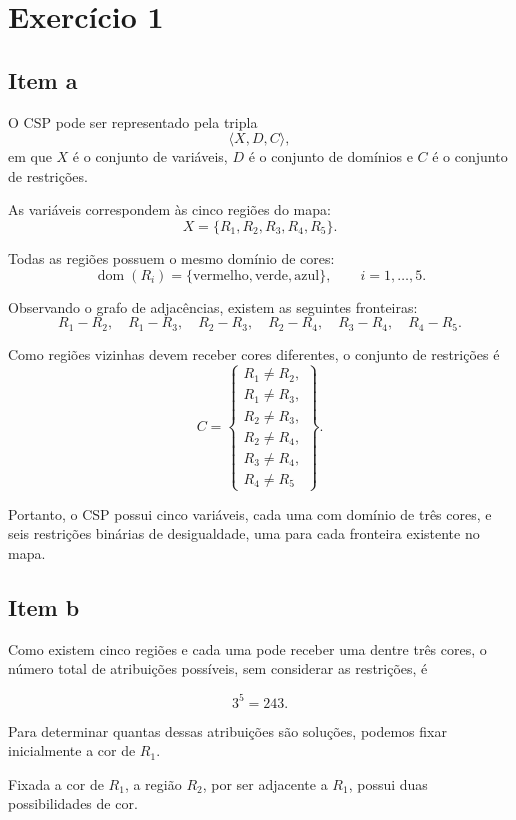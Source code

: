 \section{Exercício 1}
\subsection{Item a}

O CSP pode ser representado pela tripla
\[
\langle X,D,C\rangle,
\]
em que $X$ é o conjunto de variáveis, $D$ é o conjunto de domínios
e $C$ é o conjunto de restrições.

As variáveis correspondem às cinco regiões do mapa:
\[
X=\{R_1,R_2,R_3,R_4,R_5\}.
\]

Todas as regiões possuem o mesmo domínio de cores:
\[
\operatorname{dom}(R_i)
=
\{\text{vermelho},\text{verde},\text{azul}\},
\qquad i=1,\ldots,5.
\]

Observando o grafo de adjacências, existem as seguintes fronteiras:
\[
R_1-R_2,\quad
R_1-R_3,\quad
R_2-R_3,\quad
R_2-R_4,\quad
R_3-R_4,\quad
R_4-R_5.
\]

Como regiões vizinhas devem receber cores diferentes, o conjunto de
restrições é
\[
C=
\left\{
\begin{array}{l}
R_1 \neq R_2,\\
R_1 \neq R_3,\\
R_2 \neq R_3,\\
R_2 \neq R_4,\\
R_3 \neq R_4,\\
R_4 \neq R_5
\end{array}
\right\}.
\]

Portanto, o CSP possui cinco variáveis, cada uma com domínio de três
cores, e seis restrições binárias de desigualdade, uma para cada
fronteira existente no mapa.

\subsection*{Item b}

Como existem cinco regiões e cada uma pode receber uma dentre três
cores, o número total de atribuições possíveis, sem considerar as
restrições, é

\[
3^5 = 243.
\]

Para determinar quantas dessas atribuições são soluções, podemos fixar
inicialmente a cor de $R_1$.

Fixada a cor de $R_1$, a região $R_2$, por ser adjacente a $R_1$,
possui duas possibilidades de cor.

